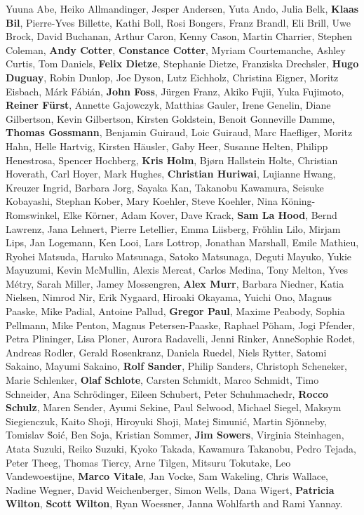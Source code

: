 Yuuna Abe,
Heiko Allmandinger,
Jesper Andersen,
Yuta Ando,
Julia Belk,
\textbf{Klaas Bil},
Pierre-Yves Billette,
Kathi Boll,
Rosi Bongers,
Franz Brandl,
Eli Brill,
Uwe Brock,
David Buchanan,
Arthur Caron,
Kenny Cason,
Martin  Charrier,
Stephen Coleman,
\textbf{Andy Cotter},
\textbf{Constance Cotter},
Myriam Courtemanche,
Ashley  Curtis,
Tom Daniels,
\textbf{Felix Dietze},
Stephanie Dietze,
Franziska Drechsler,
\textbf{Hugo Duguay},
Robin Dunlop,
Joe Dyson,
Lutz Eichholz,
Christina Eigner,
Moritz Eisbach,
M\'{a}rk  F\'{a}bi\'{a}n,
\textbf{John Foss},
J\"{u}rgen  Franz,
Akiko Fujii,
Yuka Fujimoto,
\textbf{Reiner F\"{u}rst},
Annette Gajowczyk,
Matthias Gauler,
Irene Genelin,
Diane Gilbertson,
Kevin Gilbertson,
Kirsten Goldstein,
Benoit Gonneville Damme,
\textbf{Thomas Gossmann},
Benjamin Guiraud,
Loic Guiraud,
Marc Haefliger,
Moritz Hahn,
Helle Hartvig,
Kirsten H\"{a}usler,
Gaby Heer,
Susanne Helten,
Philipp Henestrosa,
Spencer Hochberg,
\textbf{Kris Holm},
Bj{\o}rn Hallstein Holte,
Christian Hoverath,
Carl Hoyer,
Mark  Hughes,
\textbf{Christian Huriwai},
Lujianne Hwang,
Kreuzer Ingrid,
Barbara Jorg,
Sayaka Kan,
Takanobu Kawamura,
Seisuke Kobayashi,
Stephan Kober,
Mary  Koehler,
Steve Koehler,
Nina K\"{o}ning-Romswinkel,
Elke K\"{o}rner,
Adam Kover,
Dave Krack,
\textbf{Sam La Hood},
Bernd Lawrenz,
Jana Lehnert,
Pierre Letellier,
Emma Liisberg,
Fr\"{o}hlin Lilo,
Mirjam  Lips,
Jan Logemann,
Ken Looi,
Lars Lottrop,
Jonathan Marshall,
Emile Mathieu,
Ryohei Matsuda,
Haruko Matsunaga,
Satoko Matsunaga,
Deguti Mayuko,
Yukie Mayuzumi,
Kevin McMullin,
Alexis  Mercat,
Carlos Medina,
Tony Melton,
Yves M\'{e}try,
Sarah Miller,
Jamey Mossengren,
\textbf{Alex  Murr},
Barbara Niedner,
Katia Nielsen,
Nimrod Nir,
Erik Nygaard,
Hiroaki Okayama,
Yuichi Ono,
Magnus Paaske,
Mike Padial,
Antoine Pallud,
\textbf{Gregor Paul},
Maxime Peabody,
Sophia Pellmann,
Mike Penton,
Magnus Petersen-Paaske,
Raphael P\"{o}ham,
Jogi Pfender,
Petra Plininger,
Lisa Ploner,
Aurora Radavelli,
Jenni Rinker,
AnneSophie Rodet,
Andreas Rodler,
Gerald  Rosenkranz,
Daniela Ruedel,
Niels Rytter,
Satomi Sakaino,
Mayumi Sakaino,
\textbf{Rolf Sander},
Philip  Sanders,
Christoph Scheneker,
Marie Schlenker,
\textbf{Olaf Schlote},
Carsten Schmidt,
Marco Schmidt,
Timo Schneider,
Ana Schr\"{o}dinger,
Eileen  Schubert,
Peter Schuhmachedr,
\textbf{Rocco Schulz},
Maren Sender,
Ayumi Sekine,
Paul Selwood,
Michael Siegel,
Maksym  Siegienczuk,
Kaito Shoji,
Hiroyuki Shoji,
Matej \u{S}imuni\'{c},
Martin Sjönneby,
Tomislav \u{S}oi\'{c},
Ben Soja,
Kristian Sommer,
\textbf{Jim Sowers},
Virginia Steinhagen,
Atata Suzuki,
Reiko Suzuki,
Kyoko Takada,
Kawamura Takanobu,
Pedro Tejada,
Peter Theeg,
Thomas  Tiercy,
Arne Tilgen,
Mitsuru Tokutake,
Leo Vandewoestijne,
\textbf{Marco Vitale},
Jan Vocke,
Sam Wakeling,
Chris Wallace,
Nadine Wegner,
David Weichenberger,
Simon Wells,
Dana Wigert,
\textbf{Patricia  Wilton},
\textbf{Scott Wilton},
Ryan Woessner,
Janna Wohlfarth
and
Rami Yannay.
